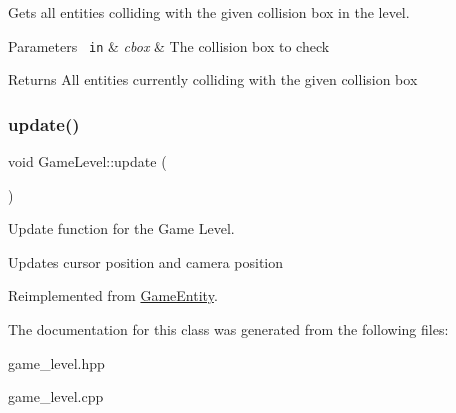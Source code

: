Gets all entities colliding with the given collision box in the level. 


\begin{DoxyParams}[1]{Parameters}
\mbox{\texttt{ in}}  & {\em cbox} & The collision box to check\\
\hline
\end{DoxyParams}
\begin{DoxyReturn}{Returns}
All entities currently colliding with the given collision box 
\end{DoxyReturn}
\mbox{\label{class_game_level_ab5570d8406f71f4439a1bda0e7d99efa}} 
\subsubsection{\texorpdfstring{update()}{update()}}
{\footnotesize\ttfamily void Game\+Level\+::update (\begin{DoxyParamCaption}{ }\end{DoxyParamCaption})\hspace{0.3cm}{\ttfamily [virtual]}}



Update function for the Game Level. 

Updates cursor position and camera position 

Reimplemented from \mbox{\hyperlink{class_game_entity_a49d0e8b07028c0f7884c3daf35521375}{Game\+Entity}}.



The documentation for this class was generated from the following files\+:\begin{DoxyCompactItemize}
\item 
game\+\_\+level.\+hpp\item 
game\+\_\+level.\+cpp\end{DoxyCompactItemize}
